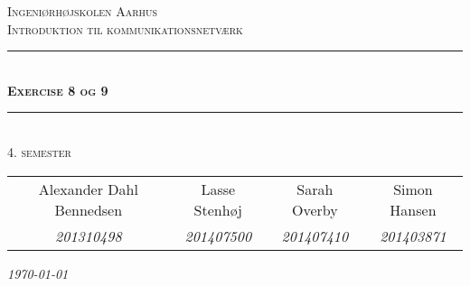 \newcommand{\HRule}{\rule{\linewidth}{0.1mm}} %
	
\begin{center}
	
\textsc{\LARGE Ingeniørhøjskolen Aarhus}\\[1.5cm] %

\textsc{\large Introduktion til kommunikationsnetværk}\\[2.5cm] 
\HRule \\[0.8cm]
{\huge \bfseries \textsc{Exercise 8 og 9}}\\[0.4cm]
\HRule \\[1.5cm]

\textsc{\large 4. semester}\\
\vspace{0.5 in}
\begin{tabular}{c c c c}
	Alexander Dahl Bennedsen & Lasse Stenhøj & Sarah Overby &  Simon Hansen   \\
	\textsl{201310498} & \textsl{201407500} &\textsl{201407410} & \textsl{201403871}
\end{tabular}

\vspace{2.5 in}

{\large\textit{\today}} \\[3cm]
\vfill %
\end{center} %